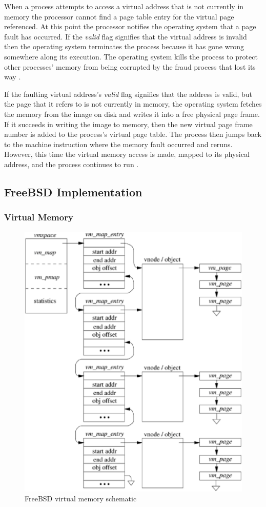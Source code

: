 \documentclass[onecolumn,draftclsnofoot, 10pt, compsoc]{IEEEtran}
\begin{document}
			When a process attempts to access a virtual address that is not currently in memory the processor cannot find a page table entry for the virtual page referenced. 
			At this point the processor notifies the operating system that a page fault has occurred.
			If the \textit{valid} flag signifies that the virtual address is invalid then the operating system terminates the process because it has gone wrong somewhere along its execution.
			The operating system kills the process to protect other processes' memory from being corrupted by the fraud process that lost its way \cite{linuxMM}.
			
			If the faulting virtual address's \textit{valid} flag signifies that the address is valid, but the page that it refers to is not currently in memory, the operating system fetches the memory from the image on disk and writes it into a free physical page frame.
			If it succeeds in writing the image to memory, then the new virtual page frame number is added to the process's virtual page table. 
			The process then jumps back to the machine instruction where the memory fault occurred and reruns. 
			However, this time the virtual memory access is made, mapped to its physical address, and the process continues to run \cite{linuxMM}.
	
	\subsection{FreeBSD Implementation}
		\subsubsection{Virtual Memory}
			\begin{figure}[H]
				\includegraphics[width=.5\textwidth, height=.35\textheight]{freebsd.eps}
				\centering
				\caption{FreeBSD virtual memory schematic \cite{freeBSDMM}}
				\label{fig:mesh3}
			\end{figure}
	
\end{document}
